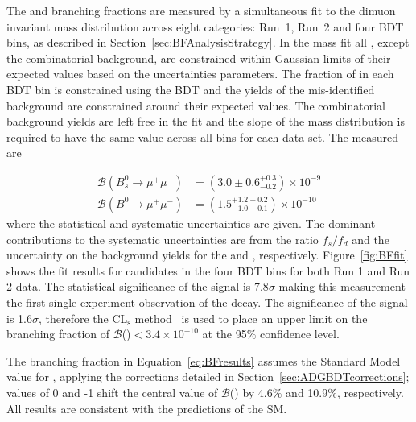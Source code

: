 {{%
The \bsmumu and \bdmumu branching fractions are measured by a simultaneous fit to the dimuon invariant mass distribution across eight categories: Run~1, Run~2 and four BDT bins, as described in Section~\ref{sec:BFAnalysisStrategy}. %
In the mass fit all \pdfs, except the combinatorial background, are constrained within Gaussian limits of their expected values based on the uncertainties \pdf parameters. 
The fraction of \bmumu in each BDT bin is constrained using the BDT \pdf and the yields of the mis-identified background are constrained around their expected values. The combinatorial background yields are left free in the fit and the slope of the mass distribution is required to have the same value across all bins for each data set.
The measured \BFs are

\begin{equation}
\begin{split}
  \mathcal{B}(B^{0}_{s} \to \mu^{+} \mu^{-}) &= (3.0 \pm 0.6^{+0.3}_{-0.2}) \times 10^{-9} \\
  \mathcal{B}(B^{0} \to \mu^{+} \mu^{-}) &= (1.5^{+1.2 +0.2}_{-1.0 -0.1})    \times 10^{-10} 
\end{split}
\label{eq:BFresults}
\end{equation}
where the statistical and systematic uncertainties are given. The dominant contributions to the systematic uncertainties are from the ratio $f_s / f_d$ and the uncertainty on the background yields for the \bsmumu and \bdmumu \BFs, respectively. Figure~\ref{fig:BFfit} shows the fit results for \bmumu candidates in the four BDT bins for both Run 1 and Run 2 data. %
The statistical significance of the \bsmumu signal is 7.8$\sigma$ making this measurement the first single experiment observation of the \bsmumu decay. The significance of the \bdmumu signal is 1.6$\sigma$, therefore the CL$_{\text{s}}$ method~\cite{0954-3899-28-10-313} is used to place an upper limit on the branching fraction of $\mathcal{B}$(\bdmumu)$ < 3.4 \times 10^{-10}$ at the 95$\%$ confidence level.

The \bsmumu branching fraction in Equation~\ref{eq:BFresults} assumes the Standard Model value for \ADG, applying the corrections detailed in Section~\ref{sec:ADGBDTcorrections}; \ADG values of 0 and -1 shift the central value of $\mathcal{B}$(\bsmumu) by 4.6$\%$ and 10.9$\%$, respectively. All results are consistent with the predictions of the SM.



}}
